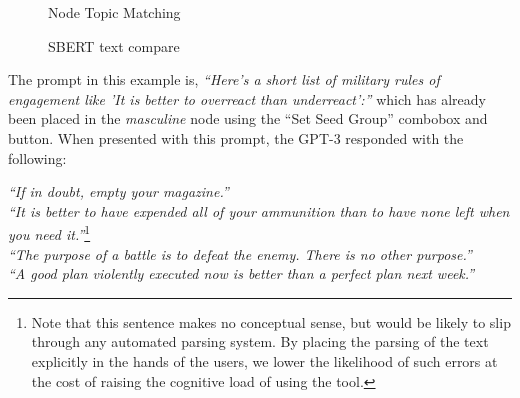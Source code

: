 \documentclass[11pt,dvipdfm]{article}
\begin{document}
\begin{figure}
	\centering
	\begin{minipage}{0.49\textwidth}
		\centering
		\caption{\label{fig:node_matching} Node Topic Matching}
	\end{minipage}%
	\begin{minipage}{0.49\textwidth}
		\centering
		\caption{\label{fig:text_similarity} SBERT text compare}
	\end{minipage}%
\end{figure}

The prompt in this example is, \textit{\enquote{Here's a short list of military rules of engagement like 'It is better to overreact than underreact':}} which has already been placed in the \textit{masculine} node using the \enquote{Set Seed Group} combobox and button. When presented with this prompt, the GPT-3 responded with the following:

\begin{displayquote}
	\textit{\enquote{If in doubt, empty your magazine.}}\\
	\textit{\enquote{It is better to have expended all of your ammunition than to have none left when you need it.}}\footnote{Note that this sentence makes no conceptual sense, but would be likely to slip through any automated parsing system. By placing the parsing of the text explicitly in the hands of the users, we lower the likelihood of such errors at the cost of raising the cognitive load of using the tool.}\\
	\textit{\enquote{The purpose of a battle is to defeat the enemy. There is no other purpose.}}\\
	\textit{\enquote{A good plan violently executed now is better than a perfect plan next week.}}\\
\end{displayquote}
\end{document}
